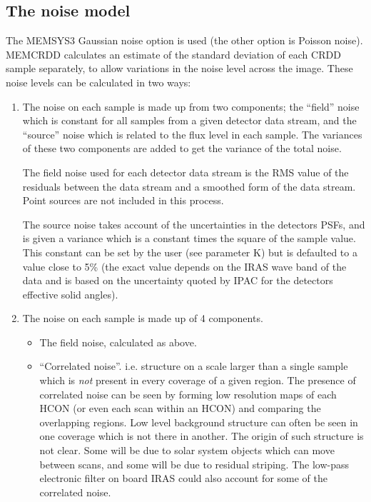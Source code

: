 \subsection {The noise model}
\label {SEC:NOISE}
The MEMSYS3 Gaussian noise option is used (the other option is Poisson noise).
MEMCRDD calculates an estimate of the standard deviation of each CRDD sample
separately, to allow variations in the noise level across the image. These 
noise levels can be calculated in two ways:
\begin{enumerate}

\item The noise on each sample is made up from two components; the ``field'' 
noise which is constant for all samples from a given detector data stream, and 
the ``source'' noise which is related to the flux level in each sample. The 
variances of these two components are added to get the variance of the total 
noise. 

The field noise used for each detector data stream is the RMS value of 
the residuals between the data stream and a smoothed form of the data stream. 
Point sources are not included in this process. 

The source noise takes account of the uncertainties in the detectors PSFs, and
is given a variance which is a constant times the square of the sample value.
This constant can be set by the user (see parameter K) but is defaulted to a
value close to 5\% (the exact value depends on the IRAS wave band of the data
and is based on the uncertainty quoted by IPAC for the detectors effective solid
angles). 

\item The noise on each sample is made up of 4 components.
\begin {itemize}
\item The field noise, calculated as above.
\item ``Correlated noise''. i.e. structure on a scale larger than a single 
sample which is {\em not} present in every coverage of a given region. The
presence of correlated noise can be seen by forming low resolution maps of each
HCON (or even each scan within an HCON) and comparing the overlapping regions.
Low level background structure can often be seen in one coverage which is not
there in another. The origin of such structure is not clear. Some will be due to
solar system objects which can move between scans, and some will be due to
residual striping. The low-pass electronic filter on board IRAS could also 
account for some of the correlated noise.


\end{itemize}
\end{enumerate}
